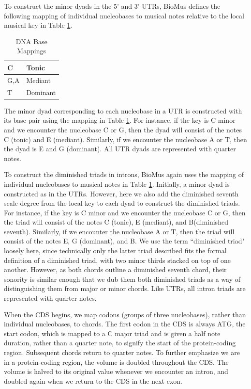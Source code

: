 \documentclass[letterpaper]{article}
\begin{document}
To construct the minor dyads in the 5' and 3' UTRs, BioMus defines the following mapping of individual nucleobases to musical notes relative to the local musical key in Table  \ref{table:nucleobases}.

\begin{table}[h!]
\centering
\begin{tabular}{|l|l|}
\hline
C   & Tonic    \\ \hline
G,A & Mediant  \\ \hline
T   & Dominant \\ \hline
\end{tabular}
\caption{DNA Base Mappings}
\label{table:nucleobases}
\end{table}

The minor dyad corresponding to each nucleobase in a UTR is constructed with its base pair using the mapping in Table  \ref{table:nucleobases}. For instance, if the key is C minor and we encounter the nucleobase C or G, then the dyad will consist of the notes C (tonic) and E\musFlat \; (mediant). Similarly, if we encounter the nucleobase A or T, then the dyad is E\musFlat \; and G (dominant). All UTR dyads are represented with quarter notes.

To construct the diminished triads in introns, BioMus again uses the mapping of individual nucleobases to musical notes in Table  \ref{table:nucleobases}. Initially, a minor dyad is constructed as in the UTRs. However, here we also add the diminished seventh scale degree from the local key to each dyad to construct the diminished triads. For instance, if the key is C minor and we encounter the nucleobase C or G, then the triad will consist of the notes C (tonic), E\musFlat \; (mediant), and B\musDoubleFlat (diminished seventh). Similarly, if we encounter the nucleobase A or T, then the triad will consist of the notes E\musFlat, G (dominant), and B\musDoubleFlat. We use the term ``diminished triad" loosely here, since technically only the latter triad described fits the formal definition of a diminished triad, with two minor thirds stacked on top of one another. However, as both chords outline a diminished seventh chord, their sonority is similar enough that we dub them both diminished triads as a way of distinguishing them from major or minor chords. Like UTRs, all intron triads are represented with quarter notes. 

When the CDS begins, we map codons (groups of three nucleobases), rather than individual nucleobases, to chords. The first codon in the CDS is always ATG, the start codon, which is mapped to a C major triad and is given a half note duration, rather than a quarter note, to signify the start of the protein-coding region. Subsequent chords return to quarter notes. To further emphasize we are in a protein-coding region, the volume is doubled throughout the CDS. The volume is halved to its original value whenever we encounter an intron, and doubled again when we return to the CDS in the next exon. 
\end{document}

